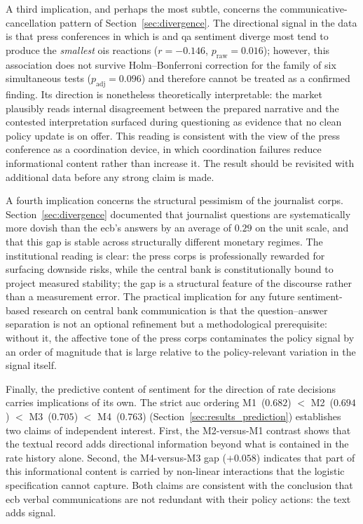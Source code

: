 A third implication, and perhaps the most subtle, concerns the communicative-cancellation pattern of Section~\ref{sec:divergence}. The directional signal in the data is that press conferences in which \gls{is} and \gls{qa} sentiment diverge most tend to produce the \emph{smallest} \gls{ois} reactions ($r = -0.146$, $p_{\text{raw}} = 0.016$); however, this association does not survive Holm--Bonferroni correction for the family of six simultaneous tests ($p_{\text{adj}} = 0.096$) and therefore cannot be treated as a confirmed finding. Its direction is nonetheless theoretically interpretable: the market plausibly reads internal disagreement between the prepared narrative and the contested interpretation surfaced during questioning as evidence that no clean policy update is on offer. This reading is consistent with the view of the press conference as a coordination device, in which coordination failures reduce informational content rather than increase it. The result should be revisited with additional data before any strong claim is made.

A fourth implication concerns the structural pessimism of the journalist corps. Section~\ref{sec:divergence} documented that journalist questions are systematically more dovish than the \gls{ecb}'s answers by an average of $0.29$ on the unit scale, and that this gap is stable across structurally different monetary regimes. The institutional reading is clear: the press corps is professionally rewarded for surfacing downside risks, while the central bank is constitutionally bound to project measured stability; the gap is a structural feature of the discourse rather than a measurement error. The practical implication for any future sentiment-based research on central bank communication is that the question--answer separation is not an optional refinement but a methodological prerequisite: without it, the affective tone of the press corps contaminates the policy signal by an order of magnitude that is large relative to the policy-relevant variation in the signal itself.

Finally, the predictive content of sentiment for the direction of rate decisions carries implications of its own. The strict \gls{auc} ordering M1~($0.682$) $<$ M2~($0.694$) $<$ M3~($0.705$) $<$ M4~($0.763$) (Section~\ref{sec:results_prediction}) establishes two claims of independent interest. First, the M2-versus-M1 contrast shows that the textual record adds directional information beyond what is contained in the rate history alone. Second, the M4-versus-M3 gap ($+0.058$) indicates that part of this informational content is carried by non-linear interactions that the logistic specification cannot capture. Both claims are consistent with the conclusion that \gls{ecb} verbal communications are not redundant with their policy actions: the text adds signal.

